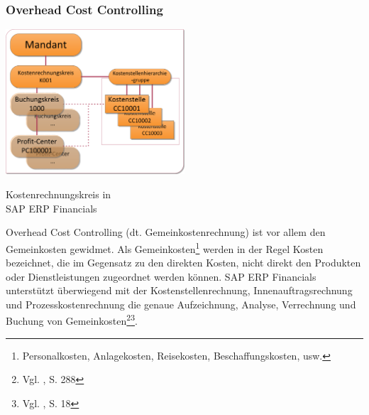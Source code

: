 \subsubsection{Overhead Cost Controlling}
\begin{floatingfigure}[htbpr]{0.5\textwidth} 
\includegraphics[width=0.5\textwidth]{Images/kostenRechnungskreis.png}
\begin{flushright}
   \caption[Kostenrechnungskreis in SAP ERP Financials]{Kostenrechnungskreis in \\SAP ERP Financials}\label{abb4}
\end{flushright}
\end{floatingfigure}\noindent
{}
Overhead Cost Controlling (dt. Gemeinkostenrechnung) ist vor allem den Gemeinkosten gewidmet. Als Gemeinkosten\footnote{Personalkosten, Anlagekosten, Reisekosten, Beschaffungskosten, usw.} werden in der Regel Kosten bezeichnet, die im Gegensatz zu den direkten Kosten, nicht direkt den Produkten oder Dienstleistungen zugeordnet werden können. SAP ERP Financials unterstützt überwiegend mit der Kostenstellenrechnung, Innenauftragsrechnung und Prozesskostenrechnung die genaue Aufzeichnung, Analyse, Verrechnung und Buchung von Gemeinkosten\footnote{Vgl. \cite{Patel2009}, S. 288}\footnote{Vgl. \cite{SAPCOOMCCA2001}, S. 18}. 

